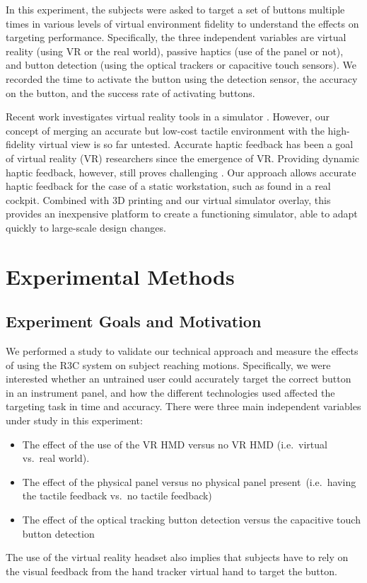 In this experiment, the subjects were asked to target a set of buttons multiple times in various levels of virtual environment fidelity to understand the effects on targeting performance.
Specifically, the three independent variables are virtual reality (using VR or the real world), passive haptics (use of the panel or not), and button detection (using the optical trackers or capacitive touch sensors).
We recorded the time to activate the button using the detection sensor, the accuracy on the button, and the success rate of activating buttons.

Recent work investigates virtual reality tools in a simulator \citep{wan_mrstudio:_2011, yavrucuk_low_2011, aslandere_virtual_2015}.
However, our concept of merging an accurate but low-cost tactile environment with the high-fidelity virtual view is so far untested.
Accurate haptic feedback has been a goal of virtual reality (VR) researchers since the emergence of VR.
Providing dynamic haptic feedback, however, still proves challenging \citep{stone_haptic_2001,lecuyer_simulating_2009}.
Our approach allows accurate haptic feedback for the case of a static workstation, such as found in a real cockpit.
Combined with 3D printing and our virtual simulator overlay, this provides an in\-expensive platform to create a functioning simulator, able to adapt quickly to large-scale design changes.

\section{Experimental Methods}

\subsection{Experiment Goals and Motivation}

We performed a study to validate our technical approach and measure the effects of using the R3C system on subject reaching motions.
Specifically, we were interested whether an untrained user could accurately target the correct button in an instrument panel, and how the different technologies used affected the targeting task in time and accuracy.
There were three main independent variables under study in this experiment:
\begin{itemize}
    \item The effect of the use of the VR HMD versus no VR HMD (i.e.\ virtual vs.\ real world).
    \item The effect of the physical panel versus no physical panel present\ (i.e.\ having the tactile feedback vs.\ no tactile feedback)
    \item The effect of the optical tracking button detection versus the capacitive touch button detection
\end{itemize}
The use of the virtual reality headset also implies that subjects have to rely on the visual feedback from the hand tracker virtual hand to target the button.

